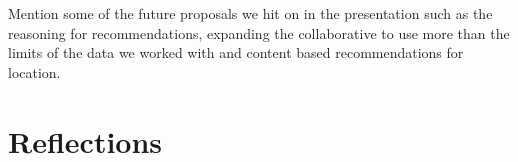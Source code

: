 \documentclass{l3proj}
\begin{document}
Mention some of the future proposals we hit on in the presentation such as the reasoning for recommendations, expanding the collaborative to use more than the limits of the data we worked with and content based recommendations for location.

\newpage

\section{Reflections}
\label{sec:reflections}








\end{document}
